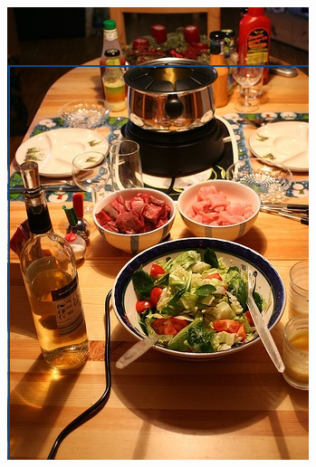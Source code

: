 \begin{figure}[h!]
\begin{subfigure}[b]{0.28\textwidth}
    \end{subfigure}
    \begin{subfigure}[b]{0.25\textwidth}
        \centering
        \includegraphics[width=\textwidth]{Images/voc_output/008591.png}
    \end{subfigure}
\end{figure}




